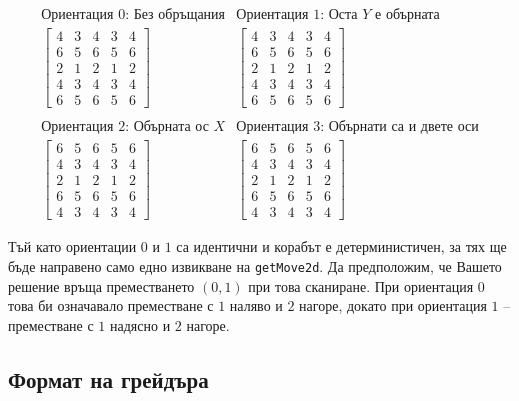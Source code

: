 \documentclass[12pt]{article}
\begin{document}
\[
\begin{array}{cc}
\text{Ориентация $0$: Без обръщания} & \text{Ориентация $1$: Оста $Y$ е обърната} \\
\left[
\begin{array}{ccccc}
4 & 3 & 4 & 3 & 4 \\
6 & 5 & 6 & 5 & 6 \\
2 & 1 & 2 & 1 & 2 \\
4 & 3 & 4 & 3 & 4 \\
6 & 5 & 6 & 5 & 6
\end{array}
\right]
&
\left[
\begin{array}{ccccc}
4 & 3 & 4 & 3 & 4 \\
6 & 5 & 6 & 5 & 6 \\
2 & 1 & 2 & 1 & 2 \\
4 & 3 & 4 & 3 & 4 \\
6 & 5 & 6 & 5 & 6 
\end{array}
\right]
\\
\\
\text{Ориентация $2$: Обърната ос $X$} & \text{Ориентация $3$: Обърнати са и двете оси} \\
\left[
\begin{array}{ccccc}
6 & 5 & 6 & 5 & 6 \\
4 & 3 & 4 & 3 & 4 \\
2 & 1 & 2 & 1 & 2 \\
6 & 5 & 6 & 5 & 6 \\
4 & 3 & 4 & 3 & 4
\end{array}
\right]
&
\left[
\begin{array}{ccccc}
6 & 5 & 6 & 5 & 6 \\
4 & 3 & 4 & 3 & 4 \\
2 & 1 & 2 & 1 & 2 \\
6 & 5 & 6 & 5 & 6 \\
4 & 3 & 4 & 3 & 4
\end{array}
\right]
\end{array}
\]


Тъй като ориентации $0$ и $1$ са идентични и корабът е детерминистичен, за тях ще бъде направено само едно извикване на \verb|getMove2d|. Да предположим, че Вашето решение връща преместването $(0, 1)$ при това сканиране. При ориентация $0$ това би означавало преместване с $1$ наляво и $2$ нагоре, докато при ориентация $1$ -- преместване с $1$ надясно и $2$ нагоре.

\subsection{Формат на грейдъра}
\end{document}
